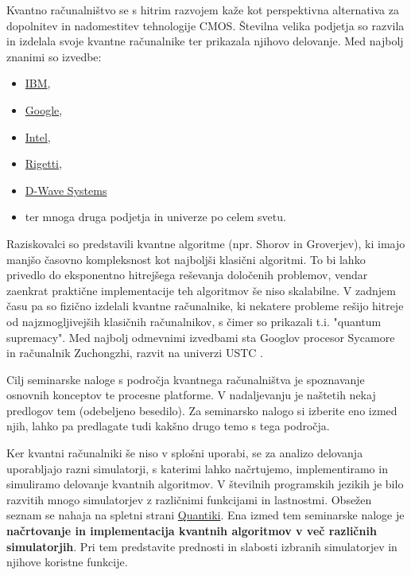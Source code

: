 Kvantno računalništvo se s hitrim razvojem kaže kot perspektivna alternativa za dopolnitev in nadomestitev tehnologije CMOS. Številna velika podjetja so razvila in izdelala svoje kvantne računalnike ter prikazala njihovo delovanje. Med najbolj znanimi so izvedbe:
\begin{itemize}
	\item \href{https://www.ibm.com/quantum-computing/}{IBM},
	\item \href{https://quantumai.google/}{Google},
	\item \href{https://www.intel.com/content/www/us/en/research/quantum-computing.html}{Intel},
	\item \href{https://www.rigetti.com/}{Rigetti},
	\item \href{https://www.dwavesys.com/}{D-Wave Systems}
	\item ter mnoga druga podjetja in univerze po celem svetu.
\end{itemize}

Raziskovalci so predstavili kvantne algoritme (npr. Shorov in Groverjev), ki imajo manjšo časovno kompleksnost kot najboljši klasični algoritmi. To bi lahko privedlo do eksponentno hitrejšega reševanja določenih problemov, vendar zaenkrat praktične implementacije teh algoritmov še niso skalabilne. V zadnjem času pa so fizično izdelali kvantne računalnike, ki nekatere probleme rešijo hitreje od najzmogljivejših klasičnih računalnikov, s čimer so prikazali t.i. "quantum supremacy". Med najbolj odmevnimi izvedbami sta Googlov procesor Sycamore \cite{arute2019quantum} in računalnik Zuchongzhi, razvit na univerzi USTC \cite{wu2021strong}.

Cilj seminarske naloge s področja kvantnega računalništva je spoznavanje osnovnih konceptov te procesne platforme. V nadaljevanju je naštetih nekaj predlogov tem (odebeljeno besedilo). Za seminarsko nalogo si izberite eno izmed njih, lahko pa predlagate tudi kakšno drugo temo s tega področja.

Ker kvantni računalniki še niso v splošni uporabi, se za analizo delovanja uporabljajo razni simulatorji, s katerimi lahko načrtujemo, implementiramo in simuliramo delovanje kvantnih algoritmov. V številnih programskih jezikih je bilo razvitih mnogo simulatorjev z različnimi funkcijami in lastnostmi. Obsežen seznam se nahaja na spletni strani \href{https://quantiki.org/wiki/list-qc-simulators}{Quantiki}. Ena izmed tem seminarske naloge je \textbf{načrtovanje in implementacija kvantnih algoritmov v več različnih simulatorjih}. Pri tem predstavite prednosti in slabosti izbranih simulatorjev in njihove koristne funkcije.

